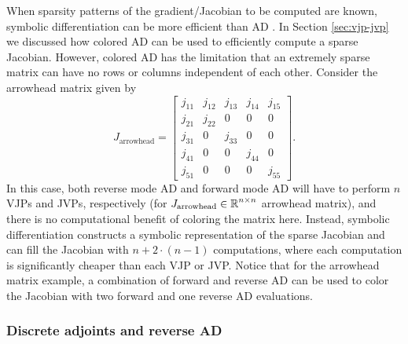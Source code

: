 When sparsity patterns of the gradient/Jacobian to be computed are known, symbolic differentiation can be more efficient than AD \cite{Lantoine_Russell_Dargent_2012}.
In Section \ref{sec:vjp-jvp} we discussed how colored AD can be used to efficiently compute a sparse Jacobian.
However, colored AD has the limitation that an extremely sparse matrix can have no rows or columns independent of each other. 
Consider the arrowhead matrix given by
\begin{equation}
    J_{\text{arrowhead}} = \begin{bmatrix}
        j_{11} & j_{12}   & j_{13} & j_{14}     & j_{15}   \\
        j_{21} & j_{22}   &  0       & 0        & 0        \\
        j_{31} & 0        & j_{33}   & 0        & 0        \\
        j_{41} & 0        & 0        & j_{44}   & 0        \\
        j_{51} & 0        & 0        & 0        & j_{55}
    \end{bmatrix}.
\end{equation}
In this case, both reverse mode AD and forward mode AD will have to perform $n$ VJPs and JVPs, respectively (for $J_{\text{arrowhead}} \in \operatorname{\mathbb{R}}^{n \times n}$ arrowhead matrix), and there is no computational benefit of coloring the matrix here. 
Instead, symbolic differentiation constructs a symbolic representation of the sparse Jacobian and can fill the Jacobian with $n + 2 \cdot (n-1)$ computations, where each computation is significantly cheaper than each VJP or JVP. 
Notice that for the arrowhead matrix example, a combination of forward and reverse AD can be used to color the Jacobian with two forward and one reverse AD evaluations. 

\subsubsection{Discrete adjoints and reverse AD}
\label{section:comparison-discrete-adjoint-AD}

